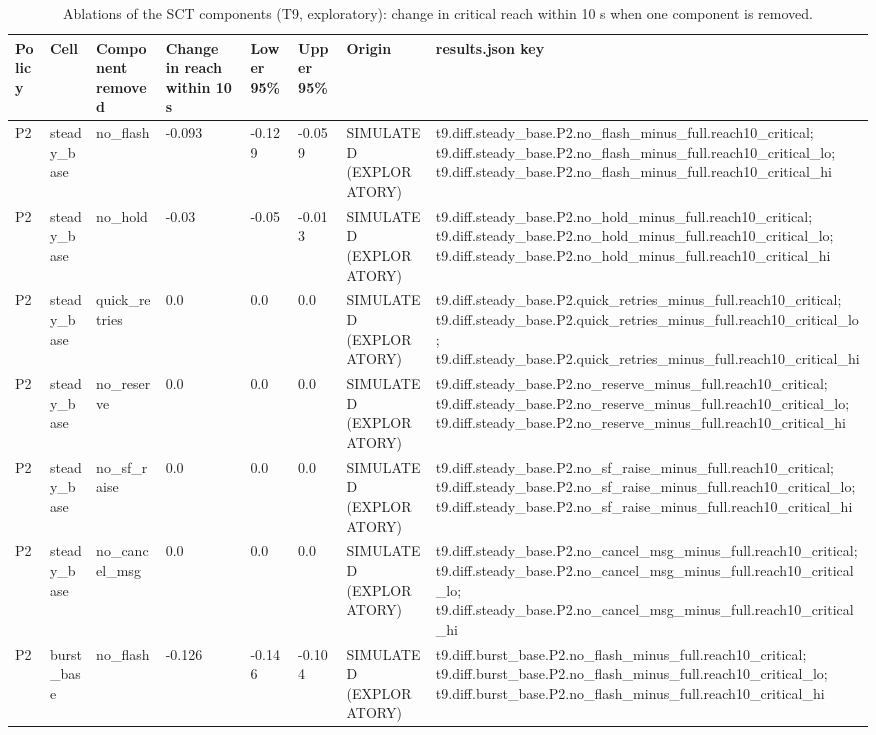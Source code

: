 \begin{table}[t]
\centering
\small
\caption{Ablations of the SCT components (T9, exploratory): change in critical reach within 10 s when one component is removed.}
\label{tab:tab_ablations}
\begin{tabular}{llllllll}
\toprule
Policy & Cell & Component removed & Change in reach within 10 s & Lower 95\% & Upper 95\% & Origin & results.json key \\
\midrule
P2 & steady\_base & no\_flash & -0.093 & -0.129 & -0.059 & SIMULATED (EXPLORATORY) & t9.diff.steady\_base.P2.no\_flash\_minus\_full.reach10\_critical; t9.diff.steady\_base.P2.no\_flash\_minus\_full.reach10\_critical\_lo; t9.diff.steady\_base.P2.no\_flash\_minus\_full.reach10\_critical\_hi \\
P2 & steady\_base & no\_hold & -0.03 & -0.05 & -0.013 & SIMULATED (EXPLORATORY) & t9.diff.steady\_base.P2.no\_hold\_minus\_full.reach10\_critical; t9.diff.steady\_base.P2.no\_hold\_minus\_full.reach10\_critical\_lo; t9.diff.steady\_base.P2.no\_hold\_minus\_full.reach10\_critical\_hi \\
P2 & steady\_base & quick\_retries & 0.0 & 0.0 & 0.0 & SIMULATED (EXPLORATORY) & t9.diff.steady\_base.P2.quick\_retries\_minus\_full.reach10\_critical; t9.diff.steady\_base.P2.quick\_retries\_minus\_full.reach10\_critical\_lo; t9.diff.steady\_base.P2.quick\_retries\_minus\_full.reach10\_critical\_hi \\
P2 & steady\_base & no\_reserve & 0.0 & 0.0 & 0.0 & SIMULATED (EXPLORATORY) & t9.diff.steady\_base.P2.no\_reserve\_minus\_full.reach10\_critical; t9.diff.steady\_base.P2.no\_reserve\_minus\_full.reach10\_critical\_lo; t9.diff.steady\_base.P2.no\_reserve\_minus\_full.reach10\_critical\_hi \\
P2 & steady\_base & no\_sf\_raise & 0.0 & 0.0 & 0.0 & SIMULATED (EXPLORATORY) & t9.diff.steady\_base.P2.no\_sf\_raise\_minus\_full.reach10\_critical; t9.diff.steady\_base.P2.no\_sf\_raise\_minus\_full.reach10\_critical\_lo; t9.diff.steady\_base.P2.no\_sf\_raise\_minus\_full.reach10\_critical\_hi \\
P2 & steady\_base & no\_cancel\_msg & 0.0 & 0.0 & 0.0 & SIMULATED (EXPLORATORY) & t9.diff.steady\_base.P2.no\_cancel\_msg\_minus\_full.reach10\_critical; t9.diff.steady\_base.P2.no\_cancel\_msg\_minus\_full.reach10\_critical\_lo; t9.diff.steady\_base.P2.no\_cancel\_msg\_minus\_full.reach10\_critical\_hi \\
P2 & burst\_base & no\_flash & -0.126 & -0.146 & -0.104 & SIMULATED (EXPLORATORY) & t9.diff.burst\_base.P2.no\_flash\_minus\_full.reach10\_critical; t9.diff.burst\_base.P2.no\_flash\_minus\_full.reach10\_critical\_lo; t9.diff.burst\_base.P2.no\_flash\_minus\_full.reach10\_critical\_hi \\

\end{tabular}
\end{table}
